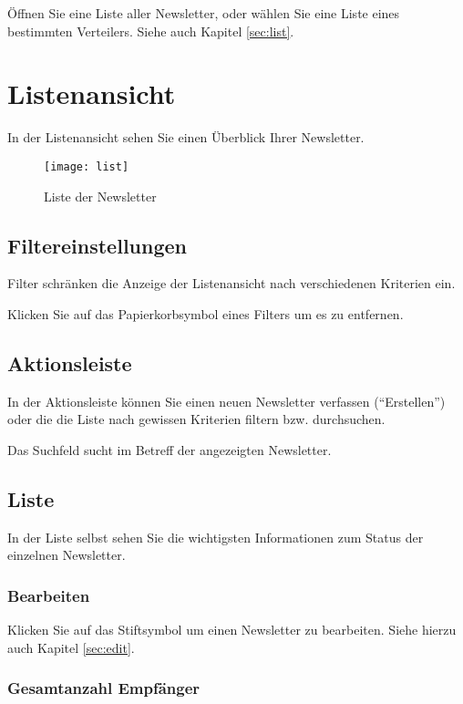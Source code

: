 \documentclass[article, a4paper, oneside, 11pt]{memoir}
\begin{document}
Öffnen Sie eine Liste aller Newsletter, oder wählen Sie eine Liste eines bestimmten Verteilers. Siehe auch Kapitel \vref{sec:list}.



\chapter{Listenansicht}
\label{sec:list}

In der Listenansicht sehen Sie einen Überblick Ihrer Newsletter.

\begin{figure}[htp]
\centering
\texttt{[image: list]}
\caption{Liste der Newsletter}
\label{fig:list}
\end{figure}

\section{Filtereinstellungen}

Filter schränken die Anzeige der Listenansicht nach verschiedenen Kriterien ein.

Klicken Sie auf das Papierkorbsymbol eines Filters um es zu entfernen.

\section{Aktionsleiste}

In der Aktionsleiste können Sie einen neuen Newsletter verfassen ("`Erstellen"') oder die die Liste nach gewissen Kriterien filtern bzw. durchsuchen.

Das Suchfeld sucht im Betreff der angezeigten Newsletter.

\section{Liste}

In der Liste selbst sehen Sie die wichtigsten Informationen zum Status der einzelnen Newsletter.

\subsection{Bearbeiten}

Klicken Sie auf das Stiftsymbol um einen Newsletter zu bearbeiten. Siehe hierzu auch Kapitel \vref{sec:edit}.

\subsection{Gesamtanzahl Empfänger}
\end{document}
